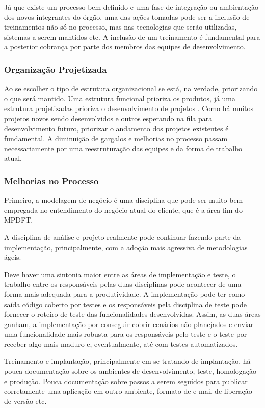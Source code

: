 \documentclass[
	article,			%
	11pt,				%
	oneside,			%
	a4paper,			%
	english,			%
	brazil,				%
	sumario=tradicional
	]{abntex2}
\begin{document}
Já que existe um processo bem definido e uma fase de integração ou ambientação
dos novos integrantes do órgão, uma das ações tomadas pode ser a inclusão de
treinamentos não só no processo, mas nas tecnologias que serão utilizadas,
sistemas a serem mantidos etc. A inclusão de um treinamento é fundamental para a
posterior cobrança por parte dos membros das equipes de desenvolvimento.

\subsubsection{Organização Projetizada}

Ao se escolher o tipo de estrutura organizacional se está, na verdade,
priorizando o que será mantido. Uma estrutura funcional prioriza os produtos, já
uma estrutura projetizadas prioriza o desenvolvimento de projetos
\cite{larson:1999:IEEE}. Como há muitos projetos novos sendo desenvolvidos e
outros esperando na fila para desenvolvimento futuro, priorizar o andamento dos
projetos existentes é fundamental. A diminuição de gargalos e melhorias no
processo passam necessariamente por uma reestruturação das equipes e da forma de
trabalho atual.

\subsubsection{Melhorias no Processo}

Primeiro, a modelagem de negócio é uma disciplina que pode ser muito bem
empregada no entendimento do negócio atual do cliente, que é a área fim do
MPDFT.

A disciplina de análise e projeto realmente pode continuar fazendo parte da
implementação, principalmente, com a adoção mais agressiva de metodologias
ágeis.

Deve haver uma sintonia maior entre as áreas de implementação e teste, o
trabalho entre os responsáveis pelas duas disciplinas pode acontecer de uma
forma mais adequada para a produtividade. A implementação pode ter como saída
código coberto por testes e os responsáveis pela disciplina de teste pode
fornecer o roteiro de teste das funcionalidades desenvolvidas. Assim, as duas
áreas ganham, a implementação por conseguir cobrir cenários não planejados e
enviar uma funcionalidade mais robusta para os responsáveis pelo teste e o teste
por receber algo mais maduro e, eventualmente, até com testes automatizados.

Treinamento e implantação, principalmente em se tratando de implantação, há
pouca documentação sobre os ambientes de desenvolvimento, teste, homologação e
produção. Pouca documentação sobre passos a serem seguidos para publicar
corretamente uma aplicação em outro ambiente, formato de e-mail de liberação de
versão etc.
\end{document}
